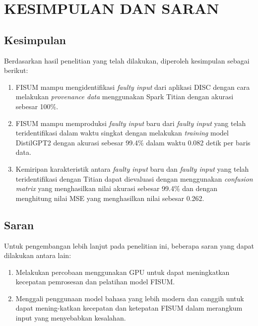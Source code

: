 \chapter{KESIMPULAN DAN SARAN}
\label{chap:kesimpulandansaran}


\section{Kesimpulan}
\label{sec:kesimpulan}

Berdasarkan hasil penelitian yang telah dilakukan, 
diperoleh kesimpulan sebagai berikut:
\begin{enumerate}[nolistsep]

  \item FISUM mampu mengidentifikasi \emph{faulty input} dari aplikasi DISC
  dengan cara melakukan \emph{provenance data} menggunakan Spark Titian dengan akurasi sebesar 100\%.
  \item FISUM mampu memproduksi \emph{faulty input} baru dari \emph{faulty input} yang telah teridentifikasi dalam waktu singkat
  dengan melakukan \emph{training} model DistilGPT2 dengan akurasi sebesar 99.4\% dalam waktu 0.082 detik per baris data.
  \item Kemiripan karakteristik antara \emph{faulty input} baru dan \emph{faulty input} yang telah teridentifikasi dengan Titian 
  dapat dievaluasi dengan menggunakan \emph{confusion matrix} yang menghasilkan nilai akurasi sebesar 99.4\%
  dan dengan menghitung nilai MSE yang menghasilkan nilai sebesar 0.262.

\end{enumerate}


\section{Saran}
\label{chap:saran}

Untuk pengembangan lebih lanjut pada penelitian ini,
beberapa saran yang dapat dilakukan antara lain:

\begin{enumerate}[nolistsep]

    \item Melakukan percobaan menggunakan GPU untuk dapat meningkatkan
    kecepatan pemrosesan dan pelatihan model FISUM. 
    \item Menggali penggunaan model bahasa yang lebih modern dan
    canggih untuk dapat mening-katkan kecepatan dan ketepatan FISUM
    dalam merangkum input yang menyebabkan kesalahan. 

\end{enumerate}
